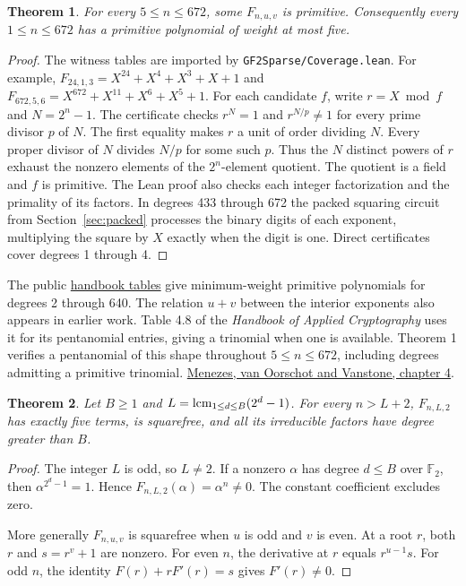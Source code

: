 \documentclass[11pt]{article}
\newtheorem{theorem}{Theorem}
\newcommand{\F}{\mathbb F_2}
\begin{document}
\begin{theorem}
For every \(5\le n\le672\), some \(F_{n,u,v}\) is primitive.
Consequently every \(1\le n\le672\) has a primitive polynomial of weight at most five.
\end{theorem}
\begin{proof}
The witness tables are imported by \texttt{GF2Sparse/Coverage.lean}.
For example, \(F_{24,1,3}=X^{24}+X^4+X^3+X+1\) and
\(F_{672,5,6}=X^{672}+X^{11}+X^6+X^5+1\).
For each candidate \(f\), write \(r=X\bmod f\) and \(N=2^n-1\).
The certificate checks \(r^N=1\) and \(r^{N/p}\ne1\) for every prime divisor
\(p\) of \(N\). The first equality makes \(r\) a unit of order dividing \(N\).
Every proper divisor of \(N\) divides \(N/p\) for some such \(p\).
Thus the \(N\) distinct powers of \(r\) exhaust the nonzero elements of the
\(2^n\)-element quotient. The quotient is a field and \(f\) is primitive.
The Lean proof also checks each integer factorization and the primality of its
factors. In degrees 433 through 672 the packed squaring circuit
from Section~\ref{sec:packed} processes the binary digits of each
exponent, multiplying the square by \(X\) exactly when the digit
is one. Direct certificates cover degrees 1 through 4.
\end{proof}
The public \href{https://people.math.carleton.ca/~daniel/hff/}{handbook tables}
give minimum-weight primitive polynomials for degrees 2 through 640.
The relation \(u+v\) between the interior exponents also appears in earlier
work. Table 4.8 of the \emph{Handbook of Applied Cryptography} uses it for
its pentanomial entries, giving a trinomial when one is available.
Theorem 1 verifies a pentanomial of this shape throughout \(5\le n\le672\),
including degrees admitting a primitive trinomial.
\href{https://cacr.uwaterloo.ca/hac/about/chap4.pdf\#page=37}{Menezes, van Oorschot and Vanstone, chapter 4}.

\begin{theorem}\label{thm:sieve}
Let \(B\ge1\) and \(L=\mathop{\rm lcm}_{1\le d\le B}(2^d-1)\).
For every \(n>L+2\), \(F_{n,L,2}\) has exactly five terms, is squarefree,
and all its irreducible factors have degree greater than \(B\).
\end{theorem}
\begin{proof}
The integer \(L\) is odd, so \(L\ne2\). If a nonzero \(\alpha\) has degree
\(d\le B\) over \(\F\), then \(\alpha^{2^d-1}=1\). Hence
\(F_{n,L,2}(\alpha)=\alpha^n\ne0\). The constant coefficient excludes zero.

More generally \(F_{n,u,v}\) is squarefree when \(u\) is odd and \(v\) is even.
At a root \(r\), both \(r\) and \(s=r^v+1\) are nonzero.
For even \(n\), the derivative at \(r\) equals \(r^{u-1}s\).
For odd \(n\), the identity \(F(r)+rF'(r)=s\) gives \(F'(r)\ne0\).
\end{proof}
\end{document}
